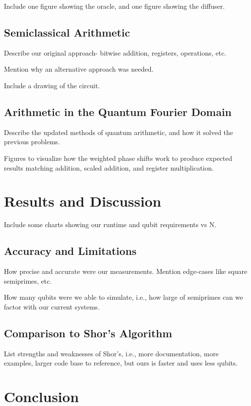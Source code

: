 \documentclass[twocolumn]{cinc}
\begin{document}
  Include one figure showing the oracle, and one figure showing the diffuser.

  \subsection{Semiclassical Arithmetic} 

  Describe our original approach- bitwise addition, registers, operations, etc.

  Mention why an alternative approach was needed.

  Include a drawing of the circuit.

  \subsection{Arithmetic in the Quantum Fourier Domain}  

  Describe the updated methods of quantum arithmetic, and how it solved the 
  previous problems.

  Figures to visualize how the weighted phase shifts work to produce
  expected results matching addition, scaled addition, and register 
  multiplication.

\section{Results and Discussion}

Include some charts showing our runtime and qubit requirements vs N.

  \subsection{Accuracy and Limitations}

  How precise and accurate were our measurements. Mention edge-cases like
  square semiprimes, etc.

  How many qubits were we able to simulate, i.e., how large of semiprimes
  can we factor with our current systems.

  \subsection{Comparison to Shor's Algorithm}

  List strengths and weaknesses of Shor's, i.e., more documentation, more
  examples, larger code base to reference, but ours is faster and uses less
  qubits.

\section{Conclusion}
\end{document}
